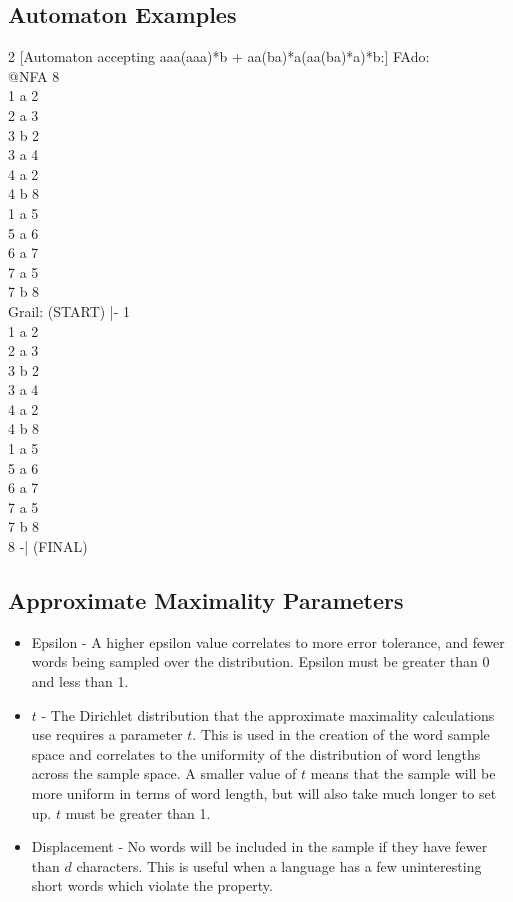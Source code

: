 \documentclass{article}
\begin{document}
\subsection{Automaton Examples}
\begin{center}
\begin{multicols}{2}
[Automaton accepting aaa(aaa)*b + aa(ba)*a(aa(ba)*a)*b:]
FAdo:\\
@NFA 8\\
1 a 2\\
2 a 3\\
3 b 2\\
3 a 4\\
4 a 2\\
4 b 8\\
1 a 5\\
5 a 6\\
6 a 7\\
7 a 5\\
7 b 8\\
\columnbreak
Grail:
(START) |- 1\\1 a 2\\2 a 3\\3 b 2\\3 a 4\\4 a 2\\4 b 8\\1 a 5\\5 a 6\\6 a 7\\7 a 5\\7 b 8\\8 -| (FINAL)
\end{multicols}
\end{center}

\subsection{Approximate Maximality Parameters}
\begin{itemize}
\item Epsilon - A higher epsilon value correlates to more error tolerance, and fewer words being sampled over the distribution. Epsilon must be greater than 0 and less than 1.
\item $t$ - The Dirichlet distribution that the approximate maximality calculations use requires a parameter $t$. 
This is used in the creation of the word sample space and correlates to the uniformity of the distribution of word lengths across the sample space. A smaller value of $t$ means that the sample will be more uniform in terms of word length, but will also take much longer to set up. 
$t$ must be greater than 1.
\item Displacement - No words will be included in the sample if they have fewer than $d$ characters.
This is useful when a language has a few uninteresting short words which violate the property.
\end{itemize}
\end{document}
